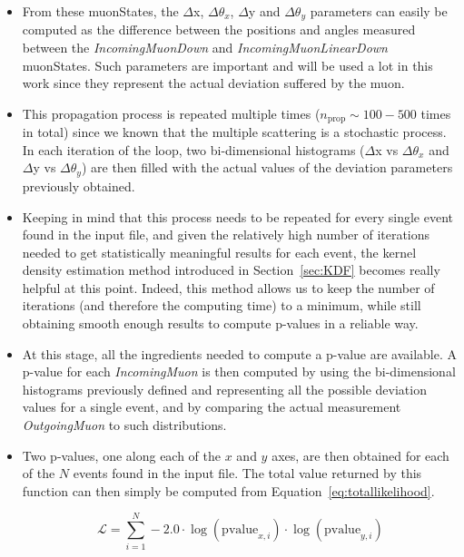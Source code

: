 \documentclass[a4paper, 11pt]{report}
\begin{document}
\begin{itemize}
\item From these muonStates, the $\Delta$x, $\Delta \theta_x$, $\Delta$y and $\Delta \theta_y$ parameters can easily be computed as the difference between the positions and angles measured between the \textit{IncomingMuonDown} and \textit{IncomingMuonLinearDown} muonStates. Such parameters are important and will be used a lot in this work since they represent the actual deviation suffered by the muon.
\item This propagation process is repeated multiple times ($n_{\text{prop}} \sim 100-500$ times in total) since we known that the multiple scattering is a stochastic process. In each iteration of the loop, two bi-dimensional histograms ($\Delta$x vs $\Delta \theta_x$ and $\Delta$y vs $\Delta \theta_y$) are then filled with the actual values of the deviation parameters previously obtained.
\item Keeping in mind that this process needs to be repeated for every single event found in the input file, and given the relatively high number of iterations needed to get statistically meaningful results for each event, the kernel density estimation method introduced in Section~\ref{sec:KDF} becomes really helpful at this point. Indeed, this method allows us to keep the number of iterations (and therefore the computing time) to a minimum, while still obtaining smooth enough results to compute p-values in a reliable way.
\item At this stage, all the ingredients needed to compute a p-value are available. A p-value for each \textit{IncomingMuon} is then computed by using the bi-dimensional histograms previously defined and representing all the possible deviation values for a single event, and by comparing the actual measurement \textit{OutgoingMuon} to such distributions.
\item Two p-values, one along each of the $x$ and $y$ axes, are then obtained for each of the $N$ events found in the input file. The total value returned by this function can then simply be computed from Equation~\ref{eq:totallikelihood}.

\begin{equation}
\label{eq:totallikelihood}
\mathcal{L} = \sum_{i = 1}^N -2.0 \cdot \log(\text{pvalue}_{x, i}) \cdot \log(\text{pvalue}_{y, i})
\end{equation}



\end{itemize}
\end{document}

